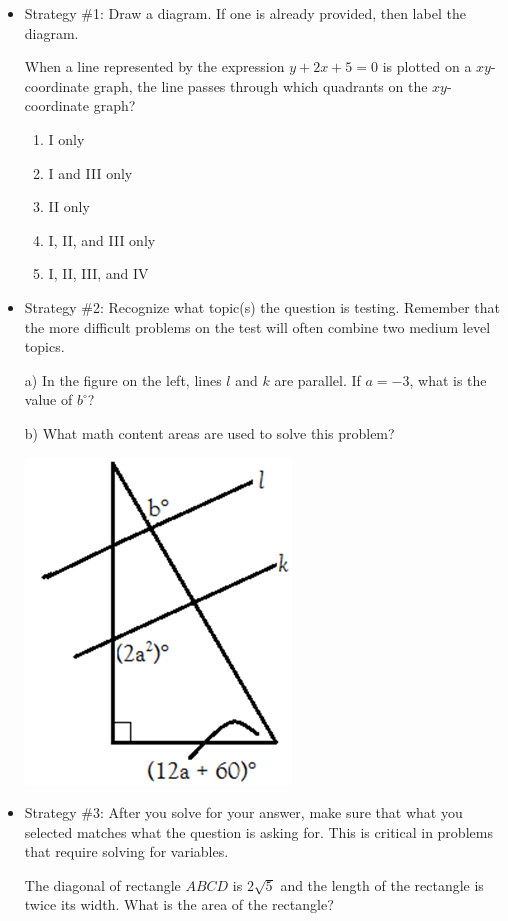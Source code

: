 \documentclass[12pt]{book}
\begin{document}
\begin{itemize}
\item Strategy \#1: Draw a diagram. If one is already provided, then label the diagram.

\bigskip
\hrulefill

When a line represented by the expression $y+2x+5=0$ is plotted on a $xy$-coordinate graph, the line passes through which quadrants on the $xy$-coordinate graph?

\begin{enumerate}[label=(\Alph*)]
\item I only
\item I and III only
\item II only
\item I, II, and III only
\item I, II, III, and IV
\end{enumerate}

\hrulefill

\bigskip
\item Strategy \#2: Recognize what topic(s) the question is testing. Remember that the more difficult problems on the test will often combine two medium level topics.

\bigskip
\hrulefill

\begin{multicols}{2}
a) In the figure on the left, lines $l$ and $k$ are parallel. If $a=-3$, what is the value of $b^\circ$?

\vfill
b) What math content areas are used to solve this problem?

\vfill

\columnbreak
\centerline{\includegraphics{42}}
\end{multicols}
\hrulefill

\bigskip
\item Strategy \#3: After you solve for your answer, make sure that what you selected matches what the question is asking for. This is critical in problems that require solving for variables.

\bigskip
\hrulefill

The diagonal of rectangle $ABCD$ is $2\sqrt{5}$ and the length of the rectangle is twice its width. What is the area of the rectangle?

\vfill
\hrulefill
\end{itemize}
\end{document}
